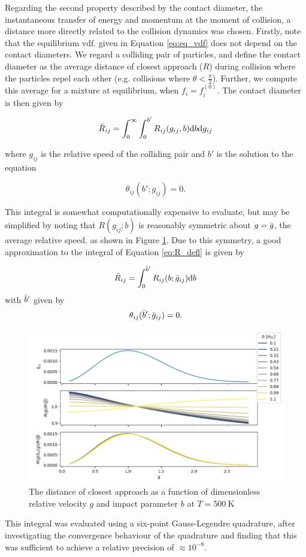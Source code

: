Regarding the second property described by the contact diameter, the instantaneous transfer of energy and momentum at the moment of collision, a distance more directly related to the collision dynamics was chosen. Firstly, note that the equilibrium vdf. given in Equation \eqref{eq:eq_vdf} does not depend on the contact diameters. We regard a colliding pair of particles, and define the contact diameter as the average distance of closest approach ($R$) during collision where the particles repel each other (e.g. collisions where $\theta < \frac{\pi}{2}$). Further, we compute this average for a mixture at equilibrium, when $f_i = f_i^{(0)}$. The contact diameter is then given by

\begin{equation}
    \Bar{R}_{ij} = \int_{0}^{\infty} \int_0^{b'} R_{ij}(g_{ij}, b) \mathrm{d} b \mathrm{d} g_{ij}
    \label{eq:R_defl}
\end{equation}

where $g_{ij}$ is the relative speed of the colliding pair and $b'$ is the solution to the equation

\begin{equation}
    \theta_{ij}(b'; g_{ij}) = 0.
\end{equation}

This integral is somewhat computationally expensive to evaluate, but may be simplified by noting that $R(g_{ij}; b)$ is reasonably symmetric about $g = \Bar{g}$, the average relative speed, as shown in Figure \ref{fig:symmetry_closest_appr}. Due to this symmetry, a good approximation to the integral of Equation \eqref{eq:R_defl} is given by

\begin{equation}
    \Bar{R}_{ij} = \int_0^{\Bar{b}'} R_{ij}(b; \Bar{g}_{ij}) \mathrm{d} b
\end{equation}
with $\Bar{b}'$ given by
\begin{equation}
    \theta_{ij}(\Bar{b}'; \Bar{g}_{ij}) = 0.
\end{equation}

\begin{figure}[htb]
    \centering
    \includegraphics[width=\textwidth]{symmetry_closest_appr}
    \caption{The distance of closest approach as a function of dimensionless relative velocity $g$ and impact parameter $b$ at $T = \SI{500}{\kelvin}$}
    \label{fig:symmetry_closest_appr}
\end{figure}

This integral was evaluated using a six-point Gauss-Legendre quadrature, after investigating the convergence behaviour of the quadrature and finding that this was sufficient to achieve a relative precision of $\approx 10^{-8}$.